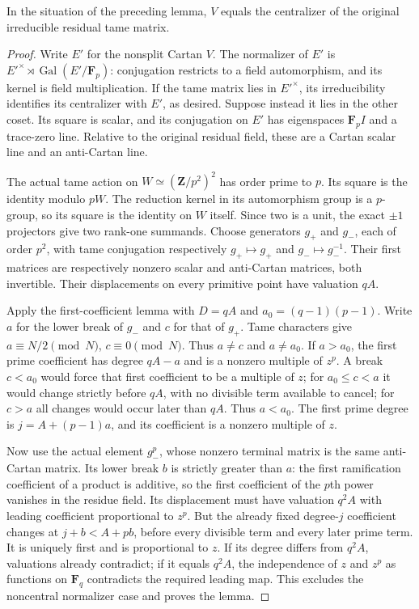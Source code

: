 \begin{lemma}
\label{lem:B-RD80-orientation}
In the situation of the preceding lemma, \(V\) equals the
centralizer of the original irreducible residual tame matrix.
\end{lemma}
\begin{proof}
Write \(E'\) for the nonsplit Cartan \(V\). The normalizer of
\(E'\) is \(E'^\times\rtimes\operatorname{Gal}(E'/\mathbf F_p)\):
conjugation restricts to a field automorphism, and its kernel is
field multiplication. If the tame matrix lies in \(E'^\times\),
its irreducibility identifies its centralizer with \(E'\), as desired.
Suppose instead it lies in the other coset. Its square is scalar,
and its conjugation on \(E'\) has eigenspaces \(\mathbf F_p I\)
and a trace-zero line. Relative to the original residual field,
these are a Cartan scalar line and an anti-Cartan line.

The actual tame action on \(W\simeq(\mathbf Z/p^2)^2\) has order
prime to \(p\). Its square is the identity modulo \(pW\).
The reduction kernel in its automorphism group is a \(p\)-group,
so its square is the identity on \(W\) itself. Since two is a
unit, the exact \(\pm1\) projectors give two rank-one summands.
Choose generators \(g_+\) and \(g_-\), each of order \(p^2\),
with tame conjugation respectively \(g_+\mapsto g_+\) and
\(g_-\mapsto g_-^{-1}\). Their first matrices are respectively
nonzero scalar and anti-Cartan matrices, both invertible.
Their displacements on every primitive point have valuation \(qA\).

Apply the first-coefficient lemma with \(D=qA\) and
\(a_0=(q-1)(p-1)\). Write \(a\) for the lower break of \(g_-\)
and \(c\) for that of \(g_+\). Tame characters give
\(a\equiv N/2\pmod N\), \(c\equiv0\pmod N\).
Thus \(a\ne c\) and \(a\ne a_0\).
If \(a>a_0\), the first prime coefficient has degree \(qA-a\)
and is a nonzero multiple of \(z^p\). A break \(c<a_0\)
would force that first coefficient to be a multiple of \(z\);
for \(a_0\le c<a\) it would change strictly before \(qA\),
with no divisible term available to cancel; for \(c>a\) all
changes would occur later than \(qA\). Thus \(a<a_0\).
The first prime degree is
\(j=A+(p-1)a\), and its coefficient is a nonzero multiple of \(z\).

Now use the actual element \(g_-^p\), whose nonzero terminal
matrix is the same anti-Cartan matrix. Its lower break \(b\)
is strictly greater than \(a\): the first ramification coefficient
of a product is additive, so the first coefficient of the \(p\)th
power vanishes in the residue field. Its displacement must have
valuation \(q^2A\) with leading coefficient proportional to \(z^p\).
But the already fixed degree-\(j\) coefficient changes at
\(j+b<A+pb\), before every divisible term and every later
prime term. It is uniquely first and is proportional to \(z\).
If its degree differs from \(q^2A\), valuations already contradict;
if it equals \(q^2A\), the independence of \(z\) and \(z^p\) as
functions on \(\mathbf F_q\) contradicts the required leading map.
This excludes the noncentral normalizer case and proves the lemma.
\end{proof}

